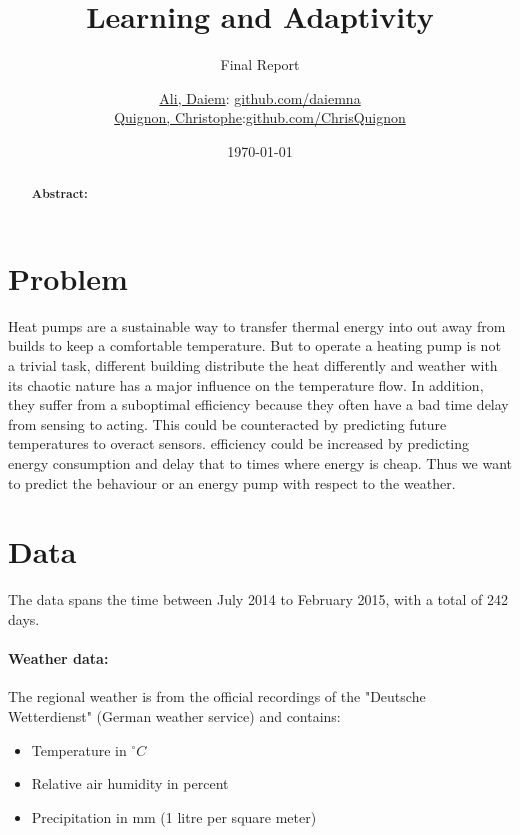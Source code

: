 \documentclass{scrartcl}
\begin{document}
\title{Learning and Adaptivity}
\subtitle{Final Report}
\author{
  \href{daiem.ali@smail.inf.h-brs.de}{Ali, Daiem}: \href{https://github.com/daiemna}{github.com/daiemna}\\
  \href{christophe.quignon@smail.inf.h-brs.de}{Quignon, Christophe}:\href{https://github.com/ChrisQuignon}{github.com/ChrisQuignon}
}
\date{\today}


\maketitle


\begin{abstract}
\textbf{Abstract:}
\end{abstract}

\section{Problem}
\label{sec:problem}
Heat pumps are a sustainable way to transfer thermal energy into out away from builds to keep a comfortable temperature. But to operate a heating pump is not a trivial task, different building distribute the heat differently and weather with its chaotic nature has a major influence on the temperature flow. In addition, they suffer from a suboptimal efficiency because they often have a bad time delay from sensing to acting. This could be counteracted by predicting future temperatures to overact sensors. efficiency could be increased by predicting energy consumption and delay that to times where energy is cheap. 
Thus we want to predict the behaviour or an energy pump with respect to the weather.


\section{Data}
\label{sec:data}
The data spans the time between July 2014 to February 2015, with a total of 242 days.

\paragraph{Weather data:}
The regional weather is from the official recordings of the "Deutsche Wetterdienst" (German weather service) and contains:

\begin{itemize}
\item Temperature in $^\circ C$
\item Relative air humidity in percent
\item Precipitation in mm (1 litre per square meter)
\end{itemize}
\end{document}

